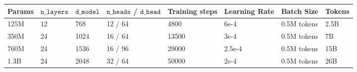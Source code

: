 \begin{tabular}{llllllll}
\hline
\textbf{Params} & \textbf{$\mathtt{n\_layers}$} & \textbf{$\mathtt{d\_model}$} & \textbf{$\mathtt{n\_heads}$ / $\mathtt{d\_head}$} & \textbf{Training steps} & \textbf{Learning Rate} & \textbf{Batch Size} & \textbf{Tokens} \\
\hline
125M & 12 & 768 & 12 / 64 & 4800 & 6e-4 & 0.5M tokens & 2.5B \\
350M & 24 & 1024 & 16 / 64 & 13500 & 3e-4 & 0.5M tokens & 7B \\
760M & 24 & 1536 & 16 / 96 & 29000 & 2.5e-4 & 0.5M tokens & 15B \\
1.3B & 24 & 2048 & 32 / 64 & 50000 & 2e-4 & 0.5M tokens & 26B \\
\hline
\end{tabular}
